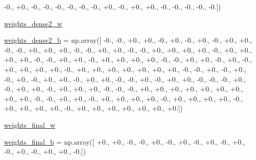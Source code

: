 \begin{DoxyCompactItemize}
-\/0., +0., -\/0., -\/0., -\/0., -\/0., -\/0., -\/0., +0., -\/0., +0., +0., -\/0., -\/0., -\/0., -\/0., -\/0.\mbox{]})
\item 
\hyperlink{namespacepybullet-gym_1_1pybulletgym_1_1tests_1_1roboschool_1_1agents_1_1_humanoid_flagrun_harder_py_bullet_env__v1__2017jul_a0f13567b4d9a21c935baa9082b52c771}{weights\+\_\+dense2\+\_\+w}
\item 
\hyperlink{namespacepybullet-gym_1_1pybulletgym_1_1tests_1_1roboschool_1_1agents_1_1_humanoid_flagrun_harder_py_bullet_env__v1__2017jul_a88093f69560917254f5b64415b59015d}{weights\+\_\+dense2\+\_\+b} = np.\+array(\mbox{[} -\/0., -\/0., +0., +0., -\/0., +0., -\/0., +0., -\/0., +0., +0., -\/0., -\/0., +0., +0., +0., -\/0., -\/0., +0., +0., -\/0., -\/0., +0., +0., +0., +0., -\/0., +0., +0., +0., +0., -\/0., -\/0., +0., +0., -\/0., +0., +0., +0., +0., -\/0., -\/0., +0., +0., -\/0., +0., -\/0., +0., +0., +0., +0., -\/0., +0., +0., +0., +0., +0., +0., +0., -\/0., -\/0., +0., -\/0., +0., -\/0., +0., -\/0., +0., +0., -\/0., +0., +0., -\/0., -\/0., +0., -\/0., +0., +0., -\/0., -\/0., -\/0., +0., -\/0., +0., +0., -\/0., +0., +0., +0., -\/0., -\/0., -\/0., +0., +0., +0., +0., +0., +0., +0., +0., +0., -\/0., -\/0., +0., +0., -\/0., +0., +0., +0., +0., -\/0., +0., +0., +0., +0., -\/0., +0., +0., +0., +0., -\/0., +0., +0., +0., +0., +0., +0., +0.\mbox{]})
\item 
\hyperlink{namespacepybullet-gym_1_1pybulletgym_1_1tests_1_1roboschool_1_1agents_1_1_humanoid_flagrun_harder_py_bullet_env__v1__2017jul_a580bfc05835a1124d0cf757b4eb21ae3}{weights\+\_\+final\+\_\+w}
\item 
\hyperlink{namespacepybullet-gym_1_1pybulletgym_1_1tests_1_1roboschool_1_1agents_1_1_humanoid_flagrun_harder_py_bullet_env__v1__2017jul_a0af4999e9266b7db56c9e15acc519199}{weights\+\_\+final\+\_\+b} = np.\+array(\mbox{[} +0., +0., -\/0., -\/0., +0., -\/0., +0., -\/0., +0., -\/0., +0., -\/0., +0., -\/0., +0., +0., -\/0.\mbox{]})
\end{DoxyCompactItemize}


